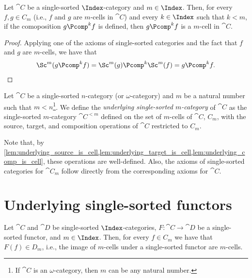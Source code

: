 \begin{lemma}
  \label{lem:underlying_comp_is_cell}
  \leanok
  Let $\cat{C}$ be a single-sorted $\Index$-category and $m \in \Index$. Then, for every $f, g \in
  C_m$ (i.e., $f$ and $g$ are $m$-cells in $\cat{C}$) and every $k \in \Index$ such that $k < m$,
  if the comoposition $g \Pcomp^k f$ is defined, then $g \Pcomp^k f$ is a $m$-cell in $\cat{C}$.
\end{lemma}

\begin{proof}
  \leanok
  Applying one of the axioms of single-sorted categories and the fact that $f$ and $g$ are
  $m$-cells, we have that
  \[
    \Sc^m (g \Pcomp^k f) = \Sc^m (g) \Pcomp^k \Sc^m (f) = g \Pcomp^k f.
  \]
\end{proof}

\begin{definition}
  \label{def:SingleSortedCategory_underlying}
  \leanok
  Let $\cat{C}$ be a single-sorted $n$-category (or $\omega$-category) and $m$ be a natural number
  such that $m < n$\footnote{If $\cat{C}$ is an $\omega$-category, then $m$ can be any natural
  number.}. We define the \emph{underlying single-sorted $m$-category} of $\cat{C}$ as the
  single-sorted $m$-category $\cat{C}^{<m}$ defined on the set of $m$-cells of $\cat{C}$, $C_m$,
  with the source, target, and composition operations of $\cat{C}$ restricted to $C_m$.

  Note that, by
  \cref{lem:underlying_source_is_cell,lem:underlying_target_is_cell,lem:underlying_comp_is_cell},
  these operations are well-defined. Also, the axioms of single-sorted categories for $\cat{C}_m$
  follow directly from the corresponding axioms for $\cat{C}$.
\end{definition}

\section{Underlying single-sorted functors}

\begin{lemma}
  \label{lem:underlying_functor_is_cell}
  \leanok
  Let $\cat{C}$ and $\cat{D}$ be single-sorted $\Index$-categories, $F \colon \cat{C} \to
  \cat{D}$ be a single-sorted functor, and $m \in \Index$. Then, for every $f \in C_m$ we have that
  $F(f) \in D_m$, i.e., the image of $m$-cells under a single-sorted functor are $m$-cells.
\end{lemma}


